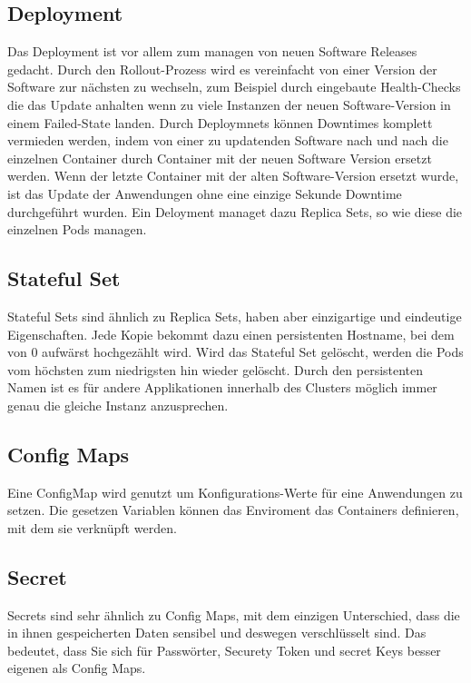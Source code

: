 \subsection{Deployment}
Das Deployment ist vor allem zum managen von neuen Software Releases gedacht. 
Durch den Rollout-Prozess wird es vereinfacht von einer Version der Software zur nächsten zu wechseln, zum Beispiel durch eingebaute Health-Checks die das Update anhalten wenn zu viele Instanzen der neuen Software-Version in einem Failed-State landen.
Durch Deploymnets können Downtimes komplett vermieden werden, indem von einer zu updatenden Software nach und nach die einzelnen Container durch Container mit der neuen Software Version ersetzt werden.
Wenn der letzte Container mit der alten Software-Version ersetzt wurde, ist das Update der Anwendungen ohne eine einzige Sekunde Downtime durchgeführt wurden.
Ein Deloyment managet dazu Replica Sets, so wie diese die einzelnen Pods managen.
\cite[S.113 ff.]{Kubernetes_up_and_running}

\subsection{Stateful Set}
Stateful Sets sind ähnlich zu Replica Sets, haben aber einzigartige und eindeutige Eigenschaften.
Jede Kopie bekommt dazu einen persistenten Hostname, bei dem von 0 aufwärst hochgezählt wird. 
Wird das Stateful Set gelöscht, werden die Pods vom höchsten zum niedrigsten hin wieder gelöscht.
Durch den persistenten Namen ist es für andere Applikationen innerhalb des Clusters möglich immer genau die gleiche Instanz anzusprechen.
\cite[S.186 f.]{Kubernetes_up_and_running}

\subsection{Config Maps}
Eine ConfigMap wird genutzt um Konfigurations-Werte für eine Anwendungen zu setzen. 
Die gesetzen Variablen können das Enviroment das Containers definieren, mit dem sie verknüpft werden.
\cite[S.153]{Kubernetes_up_and_running}

\subsection{Secret}
Secrets sind sehr ähnlich zu Config Maps, mit dem einzigen Unterschied, dass die in ihnen gespeicherten Daten sensibel und deswegen verschlüsselt sind.
Das bedeutet, dass Sie sich für Passwörter, Securety Token und secret Keys besser eigenen als Config Maps.
\cite[S.157 f.]{Kubernetes_up_and_running}

